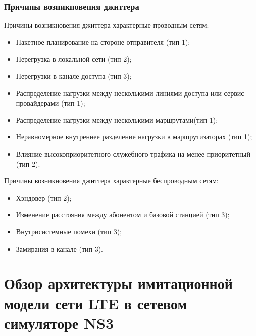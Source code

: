 \documentclass[10pt,pdf,hyperref={unicode}]{beamer}
\begin{document}
\begin{frame}
\frametitle{Причины возникновения джиттера}
{\footnotesize
\begin{exampleblock}
{Причины возникновения джиттера характерные  проводным сетям:}
\begin{itemize}
\item Пакетное планирование на стороне отправителя (тип 1);
\item Перегрузка в локальной сети (тип 2);
\item Перегрузки в канале доступа (тип 3);
\item Распределение нагрузки между несколькими линиями доступа или сервис-провайдерами (тип 1);
\item Распределение нагрузки между несколькими маршрутами(тип 1);
\item Неравномерное внутреннее разделение нагрузки в маршрутизаторах (тип 1);
\item Влияние высокоприоритетного служебного трафика на менее приоритетный (тип 2).
\end{itemize}
\end{exampleblock}

\begin{exampleblock}
{Причины возникновения джиттера характерные беспроводным сетям:}
\begin{itemize}
\item Хэндовер (тип 2);
\item Изменение расстояния между абонентом и базовой станцией (тип 3);
\item Внутрисистемные помехи (тип 3);
\item Замирания в канале (тип 3).
\end{itemize}
\end{exampleblock}
}
\end{frame}







\section{Обзор архитектуры имитационной модели сети LTE в сетевом симуляторе NS3}
\end{document}
